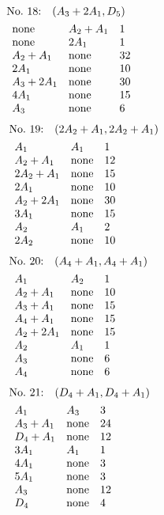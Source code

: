 %
%
\begin{align*}
&\hbox to 4cm {\textrm{No.~18:}\quad$(A_{3}+2A_{1}, D_{5})$\hss}\\ 
&\begin{array}{lll}
\none & A_{2}+A_{1} & 1\\
\none & 2A_{1} & 1\\
A_{2}+A_{1} & \none & 32\\
2A_{1} & \none & 10\\
A_{3}+2A_{1} & \none & 30\\
4A_{1} & \none & 15\\
A_{3} & \none & 6\\
\end{array}
\end{align*}
%
%
\begin{align*}
&\hbox to 4cm {\textrm{No.~19:}\quad$(2A_{2}+A_{1}, 2A_{2}+A_{1})$\hss}\\ 
&\begin{array}{lll}
A_{1} & A_{1} & 1\\
A_{2}+A_{1} & \none & 12\\
2A_{2}+A_{1} & \none & 15\\
2A_{1} & \none & 10\\
A_{2}+2A_{1} & \none & 30\\
3A_{1} & \none & 15\\
A_{2} & A_{1} & 2\\
2A_{2} & \none & 10\\
\end{array}
\end{align*}
%
%
\begin{align*}
&\hbox to 4cm {\textrm{No.~20:}\quad$(A_{4}+A_{1}, A_{4}+A_{1})$\hss}\\ 
&\begin{array}{lll}
A_{1} & A_{2} & 1\\
A_{2}+A_{1} & \none & 10\\
A_{3}+A_{1} & \none & 15\\
A_{4}+A_{1} & \none & 15\\
A_{2}+2A_{1} & \none & 15\\
A_{2} & A_{1} & 1\\
A_{3} & \none & 6\\
A_{4} & \none & 6\\
\end{array}
\end{align*}
%
%
\begin{align*}
&\hbox to 4cm {\textrm{No.~21:}\quad$(D_{4}+A_{1}, D_{4}+A_{1})$\hss}\\ 
&\begin{array}{lll}
A_{1} & A_{3} & 3\\
A_{3}+A_{1} & \none & 24\\
D_{4}+A_{1} & \none & 12\\
3A_{1} & A_{1} & 1\\
4A_{1} & \none & 3\\
5A_{1} & \none & 3\\
A_{3} & \none & 12\\
D_{4} & \none & 4\\
\end{array}
\end{align*}
